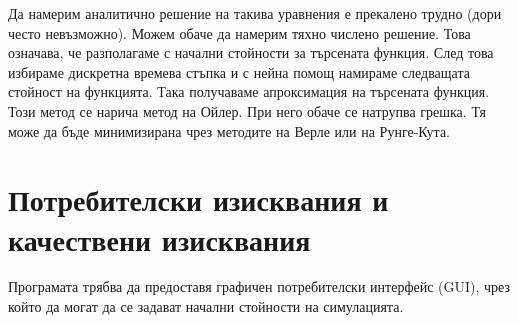 Да намерим аналитично решение на такива уравнения е прекалено трудно (дори често невъзможно). Можем обаче да намерим тяхно числено решение. Това означава, че разполагаме с начални стойности за търсената функция.
След това избираме дискретна времева стъпка  и с нейна помощ намираме следващата стойност на функцията. Така получаваме апроксимация на търсената функция. Този метод се нарича метод на Ойлер. При него обаче се натрупва грешка. Тя може да бъде минимизирана чрез методите на Верле или на Рунге-Кута.










\section{Потребителски изисквания и качествени изисквания}

Програмата трябва да предоставя графичен потребителски интерфейс (GUI), чрез
който да могат да се задават начални стойности на симулацията.

